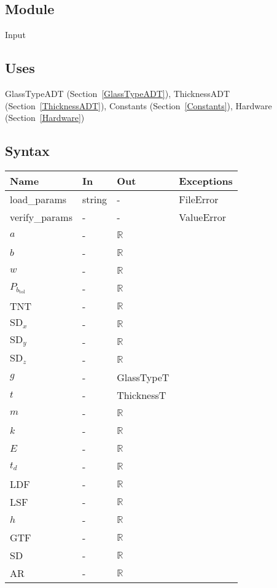 \documentclass[12pt, titlepage]{article}
\begin{document}
\subsection{Module}

Input

\subsection{Uses}

GlassTypeADT (Section~\ref{GlassTypeADT}), ThicknessADT
(Section~\ref{ThicknessADT}), Constants (Section~\ref{Constants}), Hardware
(Section~\ref{Hardware})

\subsection{Syntax}

\begin{tabular}{p{3cm} p{1cm} p{3cm} >{\raggedright\arraybackslash}p{7cm}}
\toprule
\textbf{Name} & \textbf{In} & \textbf{Out} & \textbf{Exceptions} \\
\midrule
load\_params & string & - &  FileError \\
verify\_params & - & - & ValueError \\
$a$ & - & $\mathbb{R}$\\
$b$ & - & $\mathbb{R}$\\
$w$ & - & $\mathbb{R}$\\
$P_{b_\text{tol}}$ & - & $\mathbb{R}$\\
TNT & - & $\mathbb{R}$\\
$\text{SD}_x$ & - & $\mathbb{R}$\\
$\text{SD}_y$ & - & $\mathbb{R}$\\
$\text{SD}_z$ & - & $\mathbb{R}$\\
$g$ & - & GlassTypeT\\
$t$ & - & ThicknessT\\
$m$ & - & $\mathbb{R}$\\
$k$ & - & $\mathbb{R}$\\
$E$ & - & $\mathbb{R}$\\
$t_d$ & - & $\mathbb{R}$\\
LDF & - & $\mathbb{R}$\\
LSF & - & $\mathbb{R}$\\
$h$ & - & $\mathbb{R}$\\
GTF & - & $\mathbb{R}$\\
SD & - & $\mathbb{R}$\\
AR & - & $\mathbb{R}$\\
\bottomrule
\end{tabular}
\end{document}
